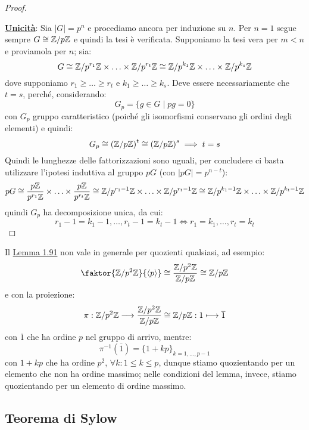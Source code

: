 \documentclass[11pt]{scrartcl}
\begin{document}
\begin{proof}
\begin{itemize}
    \end{itemize}
\underline{\textbf{Unicità}}: Sia $|G| = p^n$ e procediamo ancora per induzione su $n$. Per $n = 1$ segue sempre $G \cong {\mathbb Z}/p{\mathbb Z}$ e quindi la tesi è verificata. Supponiamo la tesi vera per $m<n$ e proviamola per $n$; sia:
        \[ G \cong \mathbb{Z}/{p^{r_1}}\mathbb{Z} \times \ldots \times \mathbb{Z}/{p^{r_t}}\mathbb{Z} \cong \mathbb{Z}/{p^{k_1}}\mathbb{Z} \times \ldots \times \mathbb{Z}/{p^{k_s}}\mathbb{Z}
            \]
        dove supponiamo $r_1 \geq \ldots \geq r_t$ e $k_1 \geq \ldots \geq k_s$. Deve essere necessariamente che $t = s$, perché, considerando:
            \[ G_p = \{g \in G \mid pg = 0\}
                \]
        con $G_p$ gruppo caratteristico (poiché gli isomorfismi conservano gli ordini degli elementi) e quindi:
            \[ G_p \cong \left({\mathbb Z}/p{\mathbb Z}\right)^t \cong \left({\mathbb Z}/p{\mathbb Z}\right)^s \implies t = s
                \]
        Quindi le lunghezze delle fattorizzazioni sono uguali, per concludere ci basta utilizzare l'ipotesi induttiva al gruppo $pG$ (con $|pG| = p^{n-t}$):
            \[ pG \cong \frac{p\mathbb Z}{p^{r_1}\mathbb Z} \times \ldots \times \frac{p\mathbb Z}{p^{r_t}\mathbb Z} \cong \mathbb{Z}/{p^{r_1-1}}\mathbb{Z} \times \ldots \times \mathbb{Z}/{p^{r_t-1}}\mathbb{Z} \cong \mathbb{Z}/{p^{k_1-1}}\mathbb{Z} \times \ldots \times \mathbb{Z}/{p^{k_t-1}}\mathbb{Z}
                \]
        quindi $G_p$ ha decomposizione unica, da cui:
            \[ r_1 - 1 = k_1 -1, \ldots, r_t - 1 = k_t - 1 \iff r_1 = k_1, \ldots , r_t = k_t
                \]
\end{proof}

\begin{remark}
    Il \hyperref[l:1.91]{Lemma 1.91} non vale in generale per quozienti qualsiasi, ad esempio:
        \[ \faktor{\Z{p^2}}{\left<p\right>} \cong \frac{\Z{p^2}}{\Zp}\cong \Zp
            \]
    e con la proiezione:
        \[ \pi: \mathbb{Z}/{p^2}\mathbb{Z} \longrightarrow \frac{\mathbb{Z}/{p^2}\mathbb{Z}}{{\mathbb Z}/p{\mathbb Z}} \cong {\mathbb Z}/p{\mathbb Z} : 1 \longmapsto \overline 1
            \]
    con $\overline 1$ che ha ordine $p$ nel gruppo di arrivo, mentre:
        \[ \pi^{-1}(\overline 1) = \{1 + kp\}_{k = 1,\ldots,p-1}
            \]
    con $1+kp$ che ha ordine $p^2$, $\forall k : 1 \leq k \leq p$, dunque stiamo quozientando per un elemento che non ha ordine massimo;
     nelle condizioni del lemma, invece, stiamo quozientando per un elemento di ordine massimo.
\end{remark}


\newpage
\subsection{Teorema di Sylow}
\end{document}
